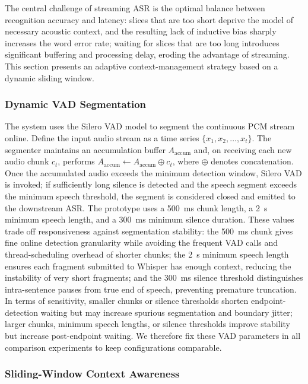 \documentclass[a4paper,11pt]{article}
\begin{document}
The central challenge of streaming ASR is the optimal balance between recognition accuracy and latency: slices that are too short deprive the model of necessary acoustic context, and the resulting lack of inductive bias sharply increases the word error rate; waiting for slices that are too long introduces significant buffering and processing delay, eroding the advantage of streaming. This section presents an adaptive context-management strategy based on a dynamic sliding window.

\subsubsection{Dynamic VAD Segmentation}

The system uses the Silero VAD model to segment the continuous PCM stream online. Define the input audio stream as a time series $\{x_1,x_2,\dots,x_t\}$. The segmenter maintains an accumulation buffer $A_{\mathrm{accum}}$ and, on receiving each new audio chunk $c_t$, performs $A_{\mathrm{accum}}\leftarrow A_{\mathrm{accum}}\oplus c_t$, where $\oplus$ denotes concatenation. Once the accumulated audio exceeds the minimum detection window, Silero VAD is invoked; if sufficiently long silence is detected and the speech segment exceeds the minimum speech threshold, the segment is considered closed and emitted to the downstream ASR. The prototype uses a 500~ms chunk length, a 2~s minimum speech length, and a 300~ms minimum silence duration. These values trade off responsiveness against segmentation stability: the 500~ms chunk gives fine online detection granularity while avoiding the frequent VAD calls and thread-scheduling overhead of shorter chunks; the 2~s minimum speech length ensures each fragment submitted to Whisper has enough context, reducing the instability of very short fragments; and the 300~ms silence threshold distinguishes intra-sentence pauses from true end of speech, preventing premature truncation. In terms of sensitivity, smaller chunks or silence thresholds shorten endpoint-detection waiting but may increase spurious segmentation and boundary jitter; larger chunks, minimum speech lengths, or silence thresholds improve stability but increase post-endpoint waiting. We therefore fix these VAD parameters in all comparison experiments to keep configurations comparable.

\subsubsection{Sliding-Window Context Awareness}
\end{document}
